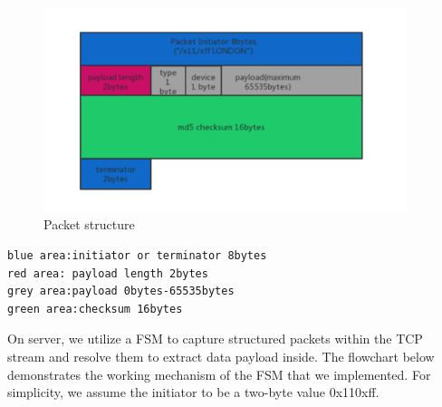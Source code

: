 \documentclass{article}
\begin{document}
\begin{figure}[H]
    \centering
    \includegraphics[width=0.95\textwidth]{packet}
    \caption{Packet structure}
    \label{fig:packet1}
\end{figure}

\begin{lstlisting}
blue area:initiator or terminator 8bytes
red area: payload length 2bytes
grey area:payload 0bytes-65535bytes
green area:checksum 16bytes
\end{lstlisting}

On server, we utilize a FSM to capture structured packets within the TCP stream and resolve them to extract data payload inside. The flowchart below demonstrates the working mechanism of the FSM that we implemented.
\newline
\hfill \break
For simplicity, we assume the initiator to be a two-byte value 0x110xff.
\end{document}
